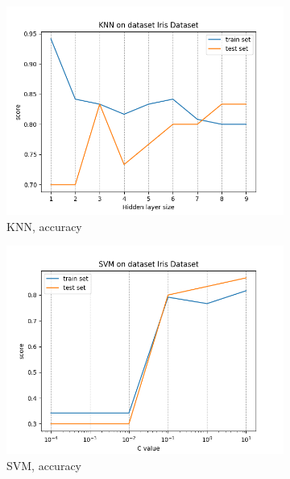 \documentclass[12pt]{article}
\newcommand*{\subfigwidth}{0.24\textwidth}
\begin{document}
\begin{figure}[H]\centering
    \begin{subfigure}[t]{\subfigwidth}
        \includegraphics[width=\linewidth]{img/other_datasets/knn/iris_accuracy.png}
        \caption{KNN, accuracy}
    \end{subfigure}
    \hfill
    \begin{subfigure}[t]{\subfigwidth}
        \includegraphics[width=\linewidth]{img/other_datasets/svm/iris_accuracy.png}
        \caption{SVM, accuracy}
    \end{subfigure}
    \hfill
    \begin{subfigure}[t]{\subfigwidth}

\end{subfigure}
\end{figure}
\end{document}
